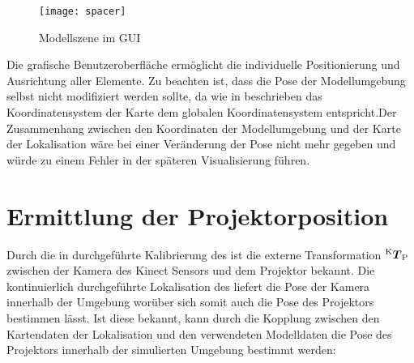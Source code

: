 \begin{figure}[!ht]
	\begin{center}
		\texttt{[image: spacer]}
		\caption{Modellszene im GUI}
		\label{fig.modscene}
	\end{center}
\end{figure}


Die grafische Benutzeroberfläche ermöglicht die individuelle Positionierung und Ausrichtung aller Elemente. Zu beachten ist, dass die Pose der Modellumgebung selbst nicht modifiziert werden sollte, da wie in  beschrieben das Koordinatensystem der Karte dem globalen Koordinatensystem entspricht. Der Zusammenhang zwischen den Koordinaten der Modellumgebung und der Karte der Lokalisation wäre bei einer Veränderung der Pose nicht mehr gegeben und würde zu einem Fehler in der späteren Visualisierung führen. 


\section{Ermittlung der Projektorposition}
Durch die in  durchgeführte Kalibrierung des  ist die externe Transformation ${^{\mathrm{K}}\mbox{\boldmath{$T$}}_{\mathrm{P}}}$ zwischen der Kamera des Kinect Sensors und dem Projektor bekannt. Die kontinuierlich durchgeführte Lokalisation des  liefert die Pose der Kamera innerhalb der Umgebung worüber sich somit auch die Pose des Projektors bestimmen lässt. Ist diese bekannt, kann durch die Kopplung zwischen den Kartendaten der Lokalisation und den verwendeten Modelldaten die Pose des Projektors innerhalb der simulierten Umgebung bestimmt werden:

